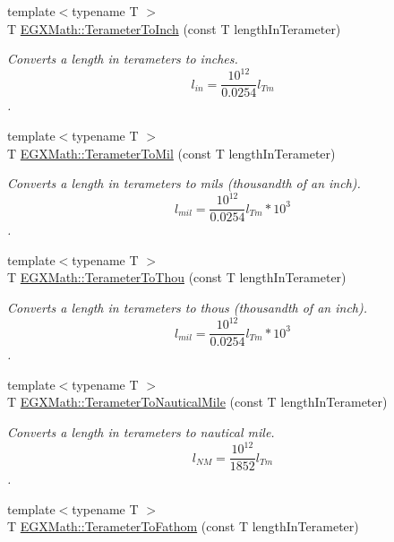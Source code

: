 \begin{DoxyCompactItemize}
{\footnotesize template$<$typename T $>$ }\\T \mbox{\hyperlink{group___e_g_x_math-_conversions-_length_conversions-_s_i-_terameter-_imperial_ga85c9ddc82ba02c1fea0b22b896fed936}{E\+G\+X\+Math\+::\+Terameter\+To\+Inch}} (const T length\+In\+Terameter)
\begin{DoxyCompactList}\small\item\em Converts a length in terameters to inches. \[ l_{in}= \frac{10^{12}}{0.0254} l_{Tm} \]. \end{DoxyCompactList}\item 
{\footnotesize template$<$typename T $>$ }\\T \mbox{\hyperlink{group___e_g_x_math-_conversions-_length_conversions-_s_i-_terameter-_imperial_ga9ae6fa58a9800d91e89f76e68838fa86}{E\+G\+X\+Math\+::\+Terameter\+To\+Mil}} (const T length\+In\+Terameter)
\begin{DoxyCompactList}\small\item\em Converts a length in terameters to mils (thousandth of an inch). \[ l_{mil}= \frac{10^{12}}{0.0254} l_{Tm} * 10^{3} \]. \end{DoxyCompactList}\item 
{\footnotesize template$<$typename T $>$ }\\T \mbox{\hyperlink{group___e_g_x_math-_conversions-_length_conversions-_s_i-_terameter-_imperial_ga3e00f52eb5c96d53031f36d7003a0e5e}{E\+G\+X\+Math\+::\+Terameter\+To\+Thou}} (const T length\+In\+Terameter)
\begin{DoxyCompactList}\small\item\em Converts a length in terameters to thous (thousandth of an inch). \[ l_{mil}= \frac{10^{12}}{0.0254} l_{Tm} * 10^{3} \]. \end{DoxyCompactList}\item 
{\footnotesize template$<$typename T $>$ }\\T \mbox{\hyperlink{group___e_g_x_math-_conversions-_length_conversions-_s_i-_terameter-_nautical_ga6a799ea329334a189c2ed5a898a238af}{E\+G\+X\+Math\+::\+Terameter\+To\+Nautical\+Mile}} (const T length\+In\+Terameter)
\begin{DoxyCompactList}\small\item\em Converts a length in terameters to nautical mile. \[ l_{NM}= \frac{10^{12}}{1852} l_{Tm} \]. \end{DoxyCompactList}\item 
{\footnotesize template$<$typename T $>$ }\\T \mbox{\hyperlink{group___e_g_x_math-_conversions-_length_conversions-_s_i-_terameter-_nautical_gaef70a960ef5e91001f3ff2bfeb0d96bf}{E\+G\+X\+Math\+::\+Terameter\+To\+Fathom}} (const T length\+In\+Terameter)

\end{DoxyCompactItemize}
